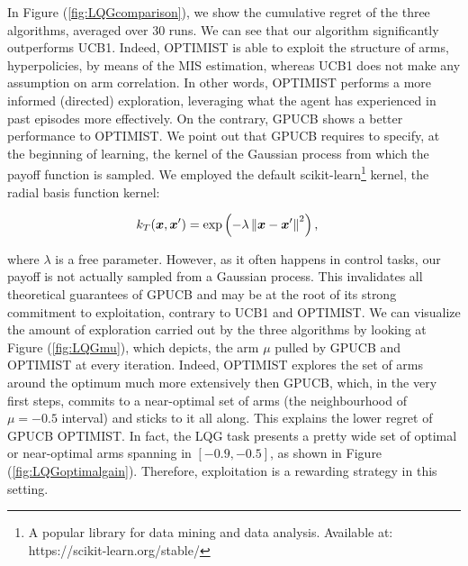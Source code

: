 In Figure (\ref{fig:LQGcomparison}), we show the cumulative regret of the three algorithms, averaged over 30 runs. We can see that our algorithm significantly outperforms \gls{UCB}1.
Indeed, \gls{OPTIMIST} is able to exploit the structure of arms, \ie hyperpolicies, by means of the \gls{MIS} estimation, whereas \gls{UCB}1 does not make any assumption on arm correlation. In other words, \gls{OPTIMIST} performs a more informed (directed) exploration, leveraging what the agent has experienced in past episodes more effectively. On the contrary, \gls{GPUCB} shows a better performance \wrt to \gls{OPTIMIST}. We point out that \gls{GPUCB} requires to specify, at the beginning of learning, the kernel of the Gaussian process from which the payoff function is sampled. We employed the default scikit-learn\footnote{A popular library for data mining and data analysis. Available at: https://scikit-learn.org/stable/} kernel, \ie the radial basis function kernel:

\begin{align}
	k_T(\boldsymbol{x},\boldsymbol{x}') &= \exp\left(-\lambda\left\|\boldsymbol{x}-\boldsymbol{x}'\right\|_{}^2\right),
\end{align}

where $\lambda$ is a free parameter. However, as it often happens in control tasks, our payoff is not actually sampled from a Gaussian process. This invalidates all theoretical guarantees of \gls{GPUCB} and may be at the root of its strong commitment to exploitation, contrary to \gls{UCB}1 and \gls{OPTIMIST}. We can visualize the amount of exploration carried out by the three algorithms by looking at Figure (\ref{fig:LQGmu}), which depicts, the arm $\mu$ pulled by \gls{GPUCB} and \gls{OPTIMIST} at every iteration. Indeed, \gls{OPTIMIST} explores the set of arms around the optimum much more extensively then \gls{GPUCB}, which, in the very first steps, commits to a near-optimal set of arms (the neighbourhood of $\mu=-0.5$ interval) and sticks to it all along. This explains the lower regret of \gls{GPUCB} \wrt \gls{OPTIMIST}. In fact, the \gls{LQG} task presents a pretty wide set of optimal or near-optimal arms spanning in $[-0.9,-0.5]$, as shown in Figure (\ref{fig:LQGoptimalgain}). Therefore, exploitation is a rewarding strategy in this setting.


